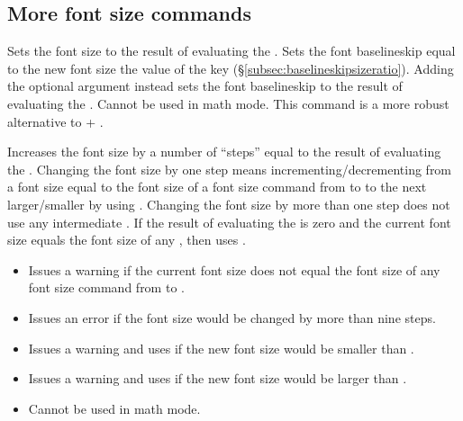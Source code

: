 \documentclass{beerydoc}
\begin{document}
\subsection{More font size commands}
\label{subsec:fontsize}

\begin{function}{\setfontsize}
  \begin{syntax}
      
  \end{syntax}
  Sets the font size to the result of evaluating the .
  Sets the font baselineskip equal to the new font size \texttimes{} the value
  of the key 
  (\S\ref{subsec:baselineskipsizeratio}).
  Adding the optional argument instead sets the font baselineskip to the
  result of evaluating the .
  Cannot be used in math mode.
  This command is a more robust alternative to  + .
\end{function}

\begin{function}{\stepfontsize}
  \begin{syntax}
     
  \end{syntax}
  Increases the font size by a number of \enquote{steps} equal to the result
  of evaluating the .
  Changing the font size by one step means incrementing\slash decrementing
  from a font size equal to the font size of a font size command from
   to  to the next larger\slash smaller
   by using .
  Changing the font size by more than one step does not use any intermediate
  .
  If the result of evaluating the  is zero and the current font
  size equals the font size of any , then
   uses .

  \begin{itemize}
    \item
    Issues a warning if the current font size does not equal the font size of
    any font size command from  to .
    \item
    Issues an error if the font size would be changed by more than nine steps.
    \item
    Issues a warning and uses  if the new font size would be smaller
    than .
    \item
    Issues a warning and uses  if the new font size would be larger
    than .
    \item
    Cannot be used in math mode.
  \end{itemize}
\end{function}
\end{document}
